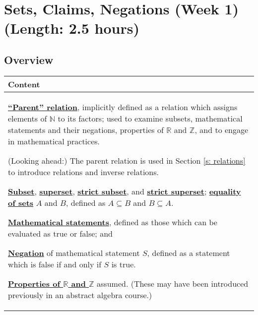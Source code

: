 \documentclass[11pt]{article}
\newcommand{\R}{\mathbb{R}}
\newcommand{\N}{\mathbb{N}}
\newcommand{\Z}{\mathbb{Z}}
\renewcommand\subset\subseteq
\renewcommand\emph[1]{\underline{\bf{#1}}} %
\theoremstyle{definition}
\begin{document}
\newpage
\section{Sets, Claims, Negations (Week 1) (Length: 2.5 hours)}  %
\label{s: sets}
\subsection{Overview}
 
 \vspace*{-16pt}
\begin{tabular}{L{6.5in}} 
{\bf Content} \\ \hline \parskip4pt
\emph{``Parent'' relation}, implicitly defined as a relation which assigns elements of $\N$ to its factors; used to examine subsets, mathematical statements and their negations, properties of $\R$ and $\Z$, and to engage in mathematical practices. 

(Looking ahead:) The parent relation is used in Section \ref{s: relations} to introduce relations and inverse relations.

\emph{Subset}, \emph{superset}, \emph{strict subset}, and \emph{strict superset}; \emph{equality of sets} $A$ and $B$, defined as $A\subset B$ and $B\subset A$.

\emph{Mathematical statements}, defined as those which can be evaluated as true or false; and 

\emph{Negation} of mathematical statement $S$, defined as a statement which is false if and only if $S$ is true.

\emph{Properties of $\R$ and $\Z$} assumed. (These may have been introduced previously in an abstract algebra course.)
\end{tabular}
\end{document}
